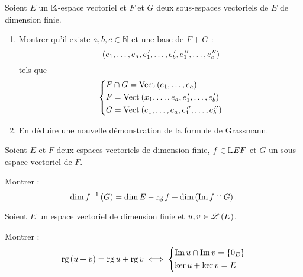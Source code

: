 \begin{corr}
\end{corr}

\begin{exo}
Soient \(E\) un \(\mathbb{K}\)-espace vectoriel et \(F\) et \(G\) deux sous-espaces vectoriels de \(E\) de dimension finie.

\begin{enumerate}
\item Montrer qu'il existe \(a,b,c\in\mathbb{N}\) et une base de \(F+G\) : \[\left(e_1,\dots,e_a,e_1^{\,\prime},\dots,e_b^{\,\prime},e_1^{\,\prime\prime},\dots,e_c^{\,\prime\prime}\right)\] tels que \[\begin{dcases}
F\inter G=\Vect{e_1,\dots,e_a} \\
F=\Vect{x_1,\dots,e_a,e_1\prim,\dots,e_b\prim} \\
G=\Vect{e_1,\dots,e_a,e_1\seconde,\dots,e_b\seconde}
\end{dcases}\]

\item En déduire une nouvelle démonstration de la formule de Grassmann.
\end{enumerate}
\end{exo}

\begin{corr}
\end{corr}

\begin{exo}
Soient \(E\) et \(F\) deux espaces vectoriels de dimension finie, \(f\in\mathbb{L}{E}{F}\) et \(G\) un sous-espace vectoriel de \(F\).

Montrer : \[\dim f^{-1}\left(G\right)=\dim E-\operatorname{rg} f+\dim\left(\operatorname{Im} f\cap G\right).\]
\end{exo}

\begin{corr}
\end{corr}

\begin{exo}
Soient \(E\) un espace vectoriel de dimension finie et \(u,v\in\mathscr{L}\left(E\right)\).

Montrer : \[\operatorname{rg}\left(u+v\right)=\operatorname{rg} u+\operatorname{rg} v\iff\begin{dcases}
\operatorname{Im} u\cap\operatorname{Im} v=\left\lbrace0_E\right\rbrace \\
\ker u+\ker v=E
\end{dcases}\]
\end{exo}

\begin{corr}
\end{corr}

